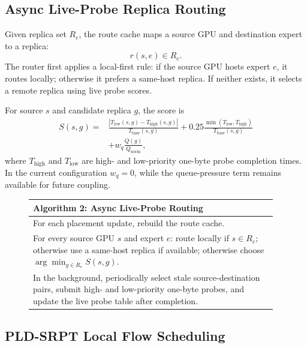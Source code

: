 \documentclass[10pt,conference]{IEEEtran}
\begin{document}
\subsection{Async Live-Probe Replica Routing}

Given replica set $R_e$, the route cache maps a source GPU and destination expert to a replica:
\begin{equation}
r(s,e) \in R_e.
\end{equation}
The router first applies a local-first rule: if the source GPU hosts expert $e$, it routes locally; otherwise it prefers a same-host replica. If neither exists, it selects a remote replica using live probe scores.

For source $s$ and candidate replica $g$, the score is
\begin{equation}
\begin{split}
S(s,g) ={}&
\frac{|T_{\mathrm{low}}(s,g)-T_{\mathrm{high}}(s,g)|}{T_{\mathrm{base}}(s,g)}
+0.25 \frac{\min(T_{\mathrm{low}},T_{\mathrm{high}})}{T_{\mathrm{base}}(s,g)}\\
&+ w_q \frac{Q(g)}{Q_{\mathrm{norm}}},
\end{split}
\end{equation}
where $T_{\mathrm{high}}$ and $T_{\mathrm{low}}$ are high- and low-priority one-byte probe completion times. In the current configuration $w_q=0$, while the queue-pressure term remains available for future coupling.

\begin{figure}[t]
\small
\begin{tabular}{p{0.96\linewidth}}
\toprule
\textbf{Algorithm 2: Async Live-Probe Routing}\\
\midrule
For each placement update, rebuild the route cache.\\
For every source GPU $s$ and expert $e$: route locally if $s \in R_e$; otherwise use a same-host replica if available; otherwise choose $\arg\min_{g\in R_e} S(s,g)$.\\
In the background, periodically select stale source-destination pairs, submit high- and low-priority one-byte probes, and update the live probe table after completion.\\
\bottomrule
\end{tabular}
\end{figure}

\subsection{PLD-SRPT Local Flow Scheduling}
\end{document}
